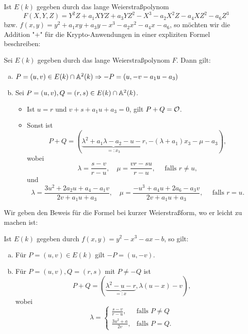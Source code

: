 Ist $E(k)$ gegeben durch das lange Weierstraßpolynom
\[ F(X,Y,Z) = Y^2Z + a_1 XYZ + a_3 YZ^2 - X^3 - a_2X^2Z - a_4 XZ^2 - a_6 Z^3 \]
bzw. $f(x,y) = y^2 + a_1xy + a_3y - x^3 - a_2x^2 - a_4x - a_6$, so möchten wir die Addition "$+$" für die Krypto-Anwendungen in einer expliziten Formel beschreiben:

\begin{satz}
\label{satz_13.13}
	Sei $E(k)$ gegeben durch das lange Weierstraßpolynom $F$. Dann gilt: \begin{enumerate}[(a)]
		\item $P = (u,v) \in E(k) \cap \mathbb{A}^2(k) \Rightarrow -P = (u,-v-a_1u-a_3)$
		\item Sei $P = (u,v), Q = (r,s) \in E(k) \cap \mathbb{A}^2(k)$. \begin{itemize}
			\item Ist $u = r$ und $v + s + a_1 u + a_3 = 0$, gilt $P + Q = \mathcal{O}$.
			\item Sonst ist 
			\[ P + Q = (\underbrace{\lambda^2 + a_1 \lambda - a_2 - u - r}_{=:x_3}, -(\lambda + a_1) x_3 - \mu - a_3), \] wobei
			\[ \lambda = \frac{s-v}{r-u}, \quad \mu = \frac{vr - su}{r-u}, \quad \text{ falls } r \neq u, \]
			und
			\[ \lambda = \frac{3u^2 + 2a_2 u +a_4 - a_1 v}{2v + a_1u + a_3}, \quad  \mu = \frac{-u^3 + a_4 u + 2a_6 - a_3v}{2v + a_1u + a_3}, \quad \text{ falls } r = u. \]
		\end{itemize}
	\end{enumerate}
\end{satz}

Wir geben den Beweis für die Formel bei kurzer Weierstraßform, wo er leicht zu machen ist:
\begin{satz}
\label{satz_13.14}
	Ist $E(k)$ gegeben durch $f(x,y) = y^2 - x^3 - ax - b$, so gilt:
	\begin{enumerate}[(a)]
		\item Für $P = (u,v) \in E(k)$ gilt $-P = (u,-v)$.
		\item Für $P = (u,v), Q = (r,s)$ mit $P \neq -Q$ ist
		\[ P + Q = (\underbrace{\lambda^2 - u - r}_{=:x}, \lambda(u-x) - v), \]
		wobei
		\[ \lambda = \begin{cases}
			\frac{s-v}{r-u}, & \text{falls } P \neq Q \\
			\frac{3u^2+a}{2v}, & \text{falls } P = Q.
		\end{cases} \]
	\end{enumerate}
\end{satz}

